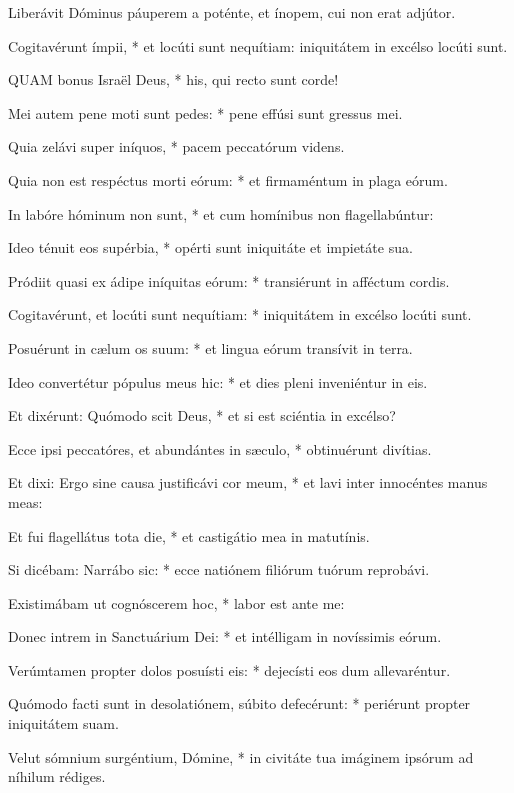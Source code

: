\rubric{\textdagger}

 Liberávit Dóminus páuperem a poténte, et ínopem, cui non erat adjútor.

 Cogitavérunt ímpii, * et locúti sunt nequítiam: iniquitátem in excélso locúti sunt.


\lettrine[lines=2]{Q}{UAM} bonus Israël Deus, * his, qui recto sunt corde!

Mei autem pene moti sunt pedes: * pene effúsi sunt gressus mei.

Quia zelávi super iníquos, * pacem peccatórum videns.

Quia non est respéctus morti eórum: * et firmaméntum in plaga eórum.

In labóre hóminum non sunt, * et cum homínibus non flagellabúntur:

Ideo ténuit eos supérbia, * opérti sunt iniquitáte et impietáte sua.

Pródiit quasi ex ádipe iníquitas eórum: * transiérunt in afféctum cordis.

Cogitavérunt, et locúti sunt nequítiam: * iniquitátem in excélso locúti sunt.

Posuérunt in cælum os suum: * et lingua eórum transívit in terra.

Ideo convertétur pópulus meus hic: * et dies pleni inveniéntur in eis.

Et dixérunt: Quómodo scit Deus, * et si est sciéntia in excélso?

Ecce ipsi peccatóres, et abundántes in sæculo, * obtinuérunt divítias.

Et dixi: Ergo sine causa justificávi cor meum, * et lavi inter innocéntes manus meas:

Et fui flagellátus tota die, * et castigátio mea in matutínis.

Si dicébam: Narrábo sic: * ecce natiónem filiórum tuórum reprobávi.

Existimábam ut cognóscerem hoc, * labor est ante me:

Donec intrem in Sanctuárium Dei: * et intélligam in novíssimis eórum.

Verúmtamen propter dolos posuísti eis: * dejecísti eos dum allevaréntur.

Quómodo facti sunt in desolatiónem, súbito defecérunt: * periérunt propter iniquitátem suam.

Velut sómnium surgéntium, Dómine, * in civitáte tua imáginem ipsórum ad níhilum rédiges.

